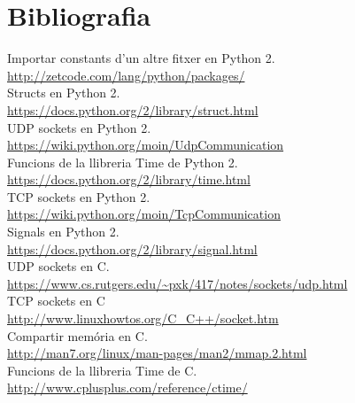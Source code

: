 \documentclass[11pt]{article}
\begin{document}
\section{Bibliografia}
Importar constants d'un altre fitxer en Python 2.\\
\url{http://zetcode.com/lang/python/packages/}\\
Structs en Python 2.\\
\url{https://docs.python.org/2/library/struct.html}\\
UDP sockets en Python 2.\\
\url{https://wiki.python.org/moin/UdpCommunication}\\
Funcions de la llibreria Time de Python 2.\\	
\url{https://docs.python.org/2/library/time.html}\\
TCP sockets en Python 2.\\
\url{https://wiki.python.org/moin/TcpCommunication}\\
Signals en Python 2.\\	
\url{https://docs.python.org/2/library/signal.html}\\
UDP sockets en C.\\
\url{https://www.cs.rutgers.edu/~pxk/417/notes/sockets/udp.html}\\
TCP sockets en C\\
\url{http://www.linuxhowtos.org/C_C++/socket.htm}	\\
Compartir memória en C.\\
\url{http://man7.org/linux/man-pages/man2/mmap.2.html}\\
Funcions de la llibreria Time de C.\\
\url{http://www.cplusplus.com/reference/ctime/}\\
\end{document}
